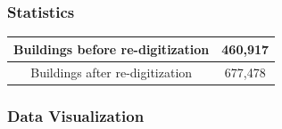 \documentclass[a4paper,12pt,twoside]{article}
\begin{document}
\subsubsection{Statistics}
\begin{center}
\begin{tabular}{|c|c|}
\hline
   Buildings before re-digitization & 460,917 \\
\hline
   Buildings after re-digitization & 677,478 \\
\hline
\end{tabular}
\end{center}

\subsubsection{Data Visualization}
\end{document}
